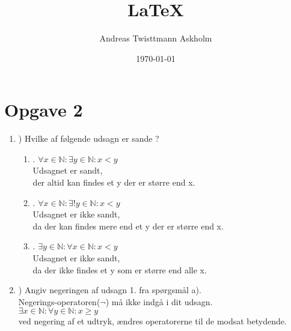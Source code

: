 \documentclass[a4paper,12pt]{article}
\title{\LaTeX{}}
\author{Andreas Twisttmann Askholm}
\date{\today}
\begin{document}
\maketitle

\section{Opgave 2}
\renewcommand{\labelenumi}{\alph{enumi}}
\renewcommand{\labelenumii}{\arabic{enumii}}
\begin{enumerate}
	\item) Hvilke af følgende udsagn er sande ?
\begin{enumerate}
	\item. \( \forall x \in  \mathbb{N}: \exists y \in \mathbb{N}: x < y\)\\

	Udsagnet er sandt,\\
	der altid kan findes et y der er større end x.\\
	
	\item. \(\forall x \in \mathbb{N}:\exists! y \in \mathbb{N}: x < y\)\\
	
	Udsagnet er ikke sandt,\\
	da der kan findes mere end et y der er større end x.\\
	
	\item. \( \exists y \in \mathbb{N}: \forall x \in \mathbb{N}: x < y\)\\
	
	Udsagnet er ikke sandt,\\
	da der ikke findes et y som er større end alle x.\\
	
\end{enumerate}
	\item) Angiv negeringen af udsagn 1. fra spørgsmål a).\\
	Negerings-operatoren($\neg$) må ikke indgå i dit udsagn.\\
	
	\(\exists x \in \mathbb{N}: \forall y \in \mathbb{N}: x \geq y\)\\
	ved negering af et udtryk, ændres operatorerne til de modsat betydende.
	
\end{enumerate}
\end{document}
